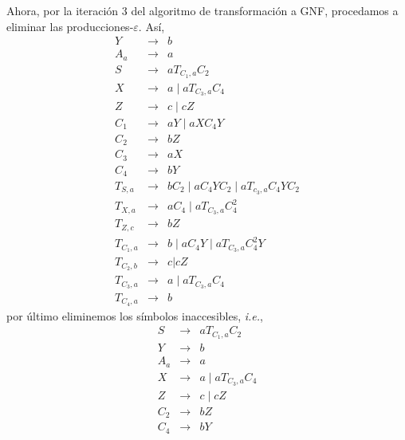\documentclass{article}
\begin{document}
\begin{enumerate}
    Ahora, por la iteración $3$ del algoritmo de transformación a GNF, procedamos a
    eliminar las producciones-$\varepsilon$. Así,
    \begin{eqnarray*}
      Y &\rightarrow& b\\
      A_a &\rightarrow& a\\
      S &\rightarrow& a T_{C_1, a} C_2\\
      X &\rightarrow& a\; |\; a T_{C_3, a} C_4 \\
      Z &\rightarrow& c\; |\; c Z\\
      C_1 &\rightarrow& aY\; |\; a X C_4 Y\\
      C_2 &\rightarrow& bZ\\
      C_3 &\rightarrow& aX\\
      C_4 &\rightarrow& bY\\
      T_{S,a} &\rightarrow& b C_2\; |\; a C_4 Y C_2\; |\; a T_{c_3, a} C_4 Y C_2\\
      T_{X,a} &\rightarrow&  a C_4\; |\; a T_{C_3, a} C_4^2\\
      T_{Z,c} &\rightarrow&  bZ\\
      T_{C_1,a} &\rightarrow& b\; |\; a C_4 Y\; |\; a T_{C_3,a} C_4^2 Y\\
      T_{C_2,b} &\rightarrow& c|cZ\\
      T_{C_3,a} &\rightarrow& a\; |\; a T_{C_3, a} C_4\\
      T_{C_4,a} &\rightarrow& b
    \end{eqnarray*}
    por último eliminemos los símbolos inaccesibles, \textit{i.e.},
    \begin{eqnarray*}
      S &\rightarrow& a T_{C_1, a} C_2\\
      Y &\rightarrow& b\\
      A_a &\rightarrow& a\\
      X &\rightarrow& a\; |\; a T_{C_3, a} C_4 \\
      Z &\rightarrow& c\; |\; c Z\\
      C_2 &\rightarrow& bZ\\
      C_4 &\rightarrow& bY\\

\end{eqnarray*}
\end{enumerate}
\end{document}
